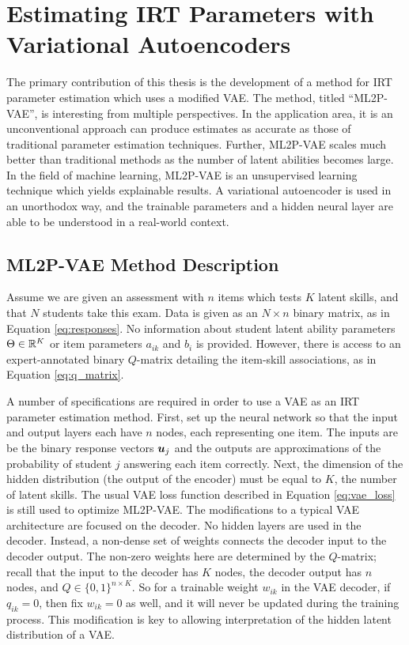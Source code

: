 \chapter{Estimating IRT Parameters with Variational Autoencoders}\label{ch:ml2pvae_methods}
The primary contribution of this thesis is the development of a method for IRT parameter estimation which uses a modified VAE. The method, titled ``ML2P-VAE'', is interesting from multiple perspectives. In the application area, it is an unconventional approach can produce estimates as accurate as those of traditional parameter estimation techniques. Further, ML2P-VAE scales much better than traditional methods as the number of latent abilities becomes large. In the field of machine learning, ML2P-VAE is an unsupervised learning technique which yields explainable results. A variational autoencoder is used in an unorthodox way, and the trainable parameters and a hidden neural layer are able to be understood in a real-world context.

\section{ML2P-VAE Method Description}\label{sec:ml2p_vae}
Assume we are given an assessment with $n$ items which tests $K$ latent skills, and that $N$ students take this exam. Data is given as an $N \times n$ binary matrix, as in Equation \ref{eq:responses}. No information about student latent ability parameters $\Theta \in \mathbb{R}^K$ or item parameters $a_{ik}$ and $b_i$ is provided. However, there is access to an expert-annotated binary $Q$-matrix detailing the item-skill associations, as in Equation \ref{eq:q_matrix}.


A number of specifications are required in order to use a VAE as an IRT parameter estimation method. First, set up the neural network so that the input and output layers each have $n$ nodes, each representing one item. The inputs are be the binary response vectors $\boldsymbol{u}_j$ and the outputs are approximations of the probability of student $j$ answering each item correctly. Next, the dimension of the hidden distribution (the output of the encoder) must be equal to $K$, the number of latent skills. The usual VAE loss function described in Equation \ref{eq:vae_loss} is still used to optimize ML2P-VAE.
The modifications to a typical VAE architecture are focused on the decoder. No hidden layers are used in the decoder. Instead, a non-dense set of weights connects the decoder input to the decoder output. The non-zero weights here are determined by the $Q$-matrix; recall that the input to the decoder has $K$ nodes, the decoder output has $n$ nodes, and $Q \in \{0,1\}^{n \times K}$. So for a trainable weight $w_{ik}$ in the VAE decoder, if $q_{ik}=0$, then fix $w_{ik}=0$ as well, and it will never be updated during the training process. This modification is key to allowing interpretation of the hidden latent distribution of a VAE.

